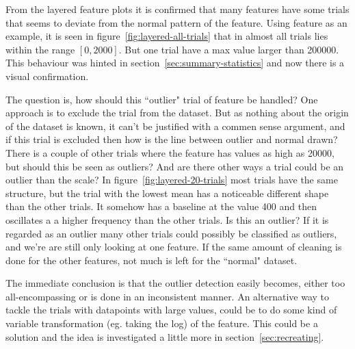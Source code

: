From the layered feature plots it is confirmed that many features have some trials that seems to deviate from the normal pattern of the feature. Using feature  as an example, it is seen in figure~\ref{fig:layered-all-trials} that  in almost all trials lies within the range $[0,2000]$. But one trial have a max value larger than 200000. This behaviour was hinted in section~\ref{sec:summary-statistics} and now there is a visual confirmation. \par
The question is, how should this ``outlier" trial of feature  be handled? One approach is to exclude the trial from the dataset. But as nothing about the origin of the dataset is known, it can't be justified with a commen sense argument, and if this trial is excluded then how is the line between outlier and normal drawn? There is a couple of other trials where the  feature has values as high as 20000, but should this be seen as outliers? And are there other ways a trial could be an outlier than the scale? In figure~\ref{fig:layered-20-trials} most trials have the same structure, but the trial with the lowest mean has a noticeable different shape than the other trials. It somehow has a baseline at the value 400 and then oscillates a a higher frequency than the other trials. Is this an outlier? If it is regarded as an outlier many other trials could possibly be classified as outliers, and we're are still only looking at one feature. If the same amount of cleaning is done for the other features, not much is left for the ``normal" dataset. \par

The immediate conclusion is that the outlier detection easily becomes, either too all-encompassing or is done in an inconsistent manner. An alternative way to tackle the trials with datapoints with large values, could be to do some kind of variable transformation (eg. taking the log) of the feature. This could be a solution and the idea is investigated a little more in section~\ref{sec:recreating}.

